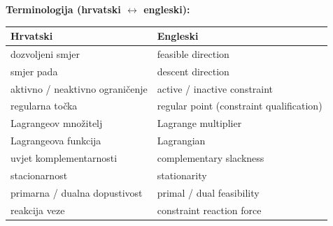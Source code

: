 \textbf{Terminologija (hrvatski $\leftrightarrow$ engleski):}

\begin{center}
\begin{tabular}{ll}
\toprule
\textbf{Hrvatski} & \textbf{Engleski} \\
\midrule
dozvoljeni smjer & feasible direction \\
smjer pada & descent direction \\
aktivno / neaktivno ograničenje & active / inactive constraint \\
regularna točka & regular point (constraint qualification) \\
Lagrangeov množitelj & Lagrange multiplier \\
Lagrangeova funkcija & Lagrangian \\
uvjet komplementarnosti & complementary slackness \\
stacionarnost & stationarity \\
primarna / dualna dopustivost & primal / dual feasibility \\
reakcija veze & constraint reaction force \\
\bottomrule
\end{tabular}
\end{center}
